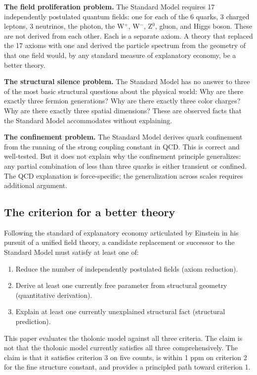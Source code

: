 \documentclass[12pt]{article}
\providecommand{\tightlist}{%
  \setlength{\itemsep}{0pt}\setlength{\parskip}{0pt}}
\begin{document}
\textbf{The field proliferation problem.} The Standard Model requires 17
independently postulated quantum fields: one for each of the 6 quarks, 3
charged leptons, 3 neutrinos, the photon, the W\(^+\), W\(^-\), Z\(^0\),
gluon, and Higgs boson. These are not derived from each other. Each is a
separate axiom. A theory that replaced the 17 axioms with one and
derived the particle spectrum from the geometry of that one field would,
by any standard measure of explanatory economy, be a better theory.

\textbf{The structural silence problem.} The Standard Model has no
answer to three of the most basic structural questions about the
physical world: Why are there exactly three fermion generations? Why are
there exactly three color charges? Why are there exactly three spatial
dimensions? These are observed facts that the Standard Model
accommodates without explaining.

\textbf{The confinement problem.} The Standard Model derives quark
confinement from the running of the strong coupling constant in QCD.
This is correct and well-tested. But it does not explain why the
confinement principle generalizes: any partial combination of less than
three quarks is either transient or confined. The QCD explanation is
force-specific; the generalization across scales requires additional
argument.

\subsection{The criterion for a better theory}\label{the-criterion-for-a-better-theory}

Following the standard of explanatory economy articulated by Einstein in
his pursuit of a unified field theory, a candidate replacement or
successor to the Standard Model must satisfy at least one of:

\begin{enumerate}
\def\labelenumi{\arabic{enumi}.}
\tightlist
\item
  Reduce the number of independently postulated fields (axiom
  reduction).
\item
  Derive at least one currently free parameter from structural geometry
  (quantitative derivation).
\item
  Explain at least one currently unexplained structural fact (structural
  prediction).
\end{enumerate}

This paper evaluates the tholonic model against all three criteria. The
claim is not that the tholonic model currently satisfies all three
comprehensively. The claim is that it satisfies criterion 3 on five
counts, is within 1 ppm on criterion 2 for the fine structure constant,
and provides a principled path toward criterion 1.
\end{document}
